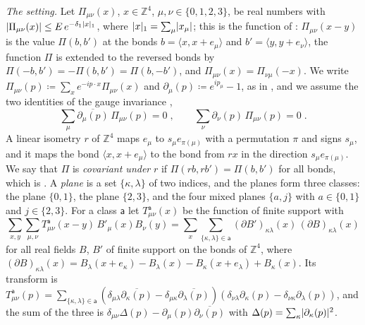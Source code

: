 \documentclass[11pt]{preprint}
\DeclarePairedDelimiter{\abs}{\lvert}{\rvert}
\numberwithin{equation}{section}
\theoremstyle{definition}
\theoremstyle{remark}
\theoremstyle{plain}
\begin{document}
\emph{The setting.} Let $\Pi_{\mu\nu}(x)$, $x \in \mathbb Z^4$, $\mu, \nu \in \{ 0, 1, 2, 3 \}$, be real numbers with $\abs{\Pi_{\mu\nu}(x)} \leq E\,e^{-\delta_1\abs x_1}$, where $\abs x_1 = \sum_\mu\abs{x_\mu}$; this is the function of \cite[(5.5), (5.8), (5.10)]{BalabanRG1}: $\Pi_{\mu\nu}(x - y)$ is the value $\Pi(b, b')$ at the bonds $b = \langle x, x + e_\mu\rangle$ and $b' = \langle y, y + e_\nu\rangle$, the function $\Pi$ is extended to the reversed bonds by $\Pi(-b, b') = -\Pi(b, b') = \Pi(b, -b')$, and $\Pi_{\mu\nu}(x) = \Pi_{\nu\mu}(-x)$. We write $\Pi_{\mu\nu}(p) \coloneqq \sum_xe^{-ip \cdot x}\Pi_{\mu\nu}(x)$ and $\partial_\mu(p) \coloneqq e^{ip_\mu} - 1$, as in \cite[(5.11), (5.15)]{BalabanRG1}, and we assume the two identities of the gauge invariance \cite[(5.15)]{BalabanRG1},
\begin{equation}\label{eq:polarisation-ward}
    \sum_\mu\overline{\partial_\mu(p)}\,\Pi_{\mu\nu}(p) = 0\;,
    \qquad
    \sum_\nu\partial_\nu(p)\,\Pi_{\mu\nu}(p) = 0\;.
\end{equation}
A linear isometry $r$ of $\mathbb Z^4$ maps $e_\mu$ to $s_\mu e_{\pi(\mu)}$ with a permutation $\pi$ and signs $s_\mu$, and it maps the bond $\langle x, x + e_\mu\rangle$ to the bond from $rx$ in the direction $s_\mu e_{\pi(\mu)}$. We say that $\Pi$ is \emph{covariant under} $r$ if $\Pi(rb, rb') = \Pi(b, b')$ for all bonds, which is \cite[(5.4)]{BalabanRG1}. A \emph{plane} is a set $\{ \kappa, \lambda \}$ of two indices, and the planes form three classes: the plane $\{ 0, 1 \}$, the plane $\{ 2, 3 \}$, and the four mixed planes $\{ a, j \}$ with $a \in \{ 0, 1 \}$ and $j \in \{ 2, 3 \}$. For a class $\mathsf a$ let $T^{\mathsf a}_{\mu\nu}(x)$ be the function of finite support with
\begin{equation}\label{eq:plane-forms}
    \sum_{x,y}\sum_{\mu,\nu}T^{\mathsf a}_{\mu\nu}(x - y)\,B'_\mu(x)B_\nu(y) = \sum_x\sum_{\{ \kappa, \lambda \} \in \mathsf a}(\partial B')_{\kappa\lambda}(x)\,(\partial B)_{\kappa\lambda}(x)
\end{equation}
for all real fields $B$, $B'$ of finite support on the bonds of $\mathbb Z^4$, where $(\partial B)_{\kappa\lambda}(x) = B_\lambda(x + e_\kappa) - B_\lambda(x) - B_\kappa(x + e_\lambda) + B_\kappa(x)$. Its transform is $T^{\mathsf a}_{\mu\nu}(p) = \sum_{\{ \kappa, \lambda \} \in \mathsf a}(\delta_{\mu\lambda}\overline{\partial_\kappa(p)} - \delta_{\mu\kappa}\overline{\partial_\lambda(p)})(\delta_{\nu\lambda}\partial_\kappa(p) - \delta_{\nu\kappa}\partial_\lambda(p))$, and the sum of the three is $\delta_{\mu\nu}\Delta(p) - \partial_\mu(p)\overline{\partial_\nu(p)}$ with $\Delta(p) = \sum_\kappa\abs{\partial_\kappa(p)}^2$.
\end{document}
